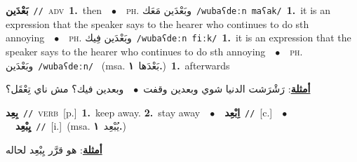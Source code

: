 \documentclass[10pt,a4paper,twoside]{article} %
\begin{document}
\begin{multicols}{2}
{\setlength\topsep{0pt}\textbf{\foreignlanguage{arabic}{بَعْدَين}}\ {\color{gray}\texttt{//}\color{black}}\ \textsc{adv}\ \textbf{1.}~then\ \ $\bullet$\ \ \textsc{ph.} \color{gray} \foreignlanguage{arabic}{وبَعْدَين مَعَك}\color{black}\ {\color{gray}\texttt{/{\sffamily wubaʕdeːn maʕak}/}\color{black}}\ \textbf{1.}~it is an expression that the speaker says to the hearer who continues to do sth annoying\ \ $\bullet$\ \ \textsc{ph.} \color{gray} \foreignlanguage{arabic}{وبَعْدَين فِيك}\color{black}\ {\color{gray}\texttt{/{\sffamily wubaʕdeːn fiːk}/}\color{black}}\ \textbf{1.}~it is an expression that the speaker says to the hearer who continues to do sth annoying\ \ $\bullet$\ \ \textsc{ph.} \color{gray} \foreignlanguage{arabic}{وبَعْدَين}\color{black}\ {\color{gray}\texttt{/{\sffamily wubaʕdeːn}/}\color{black}}\ \color{gray} (msa. \foreignlanguage{arabic}{بَعْدَها}~\foreignlanguage{arabic}{\textbf{١.}})\color{black}\ \textbf{1.}~afterwards\  \begin{flushright}\color{gray}\foreignlanguage{arabic}{\textbf{\underline{\foreignlanguage{arabic}{أمثلة}}}: رَشْرَشت الدنيا شوي وبعدين وقفت\ $\bullet$\ \  وبعدين فيك؟ مش ناي تِعْقَل؟}\end{flushright}\color{black}} \vspace{2mm}

{\setlength\topsep{0pt}\textbf{\foreignlanguage{arabic}{بِعِد}}\ {\color{gray}\texttt{//}\color{black}}\ \textsc{verb}\ [p.]\ \textbf{1.}~keep away.  \textbf{2.}~stay away\ \ $\bullet$\ \ \setlength\topsep{0pt}\textbf{\foreignlanguage{arabic}{اِبْعِد}}\ {\color{gray}\texttt{//}\color{black}}\ [c.]\ \ $\bullet$\ \ \setlength\topsep{0pt}\textbf{\foreignlanguage{arabic}{يِبْعِد}}\ {\color{gray}\texttt{//}\color{black}}\ [i.]\ \color{gray}(msa. \foreignlanguage{arabic}{يُبْعِد}~\foreignlanguage{arabic}{\textbf{١.}})\color{black}\  \begin{flushright}\color{gray}\foreignlanguage{arabic}{\textbf{\underline{\foreignlanguage{arabic}{أمثلة}}}: هو قرَّر يِبْعِد لحاله}\end{flushright}\color{black}} \vspace{2mm}


\end{multicols}
\end{document}
